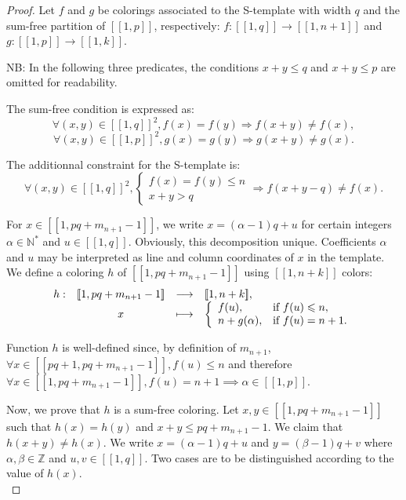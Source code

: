 \documentclass[final,onefignum,onetabnum]{siamart190516}
\begin{document}
\begin{proof}
	Let \(f\) and \(g\) be colorings associated to the S-template with width \(q\) and the sum-free partition of 
	\([\![1,p]\!]\), respectively: \(f : [\![1,q]\!] \longrightarrow [\![1,n+1]\!]\) and 
	\(g : [\![1,p]\!] \longrightarrow [\![1,k]\!]\).
	
	\par
	NB: In the following three predicates, the conditions \(x + y \leqslant q\)  and \(x + y \leqslant p\) are omitted for readability.
	\par
	The sum-free condition is expressed as:
	\[\forall (x,y) \in [\![1,q]\!]^2, f(x) = f(y) \Longrightarrow f(x+y) \neq f(x),\]
	\[\forall (x,y) \in [\![1,p]\!]^2, g(x) = g(y) \Longrightarrow g(x+y) \neq g(x).\]
	
	The additionnal constraint for the S-template is:
	\[
	\forall (x,y) \in [\![1,q]\!]^2, \left\{
	\begin{array}{l}
		f(x) = f(y) \leqslant n \\
		x + y > q
	\end{array}
	\right. \Longrightarrow f(x+y-q) \neq f(x).
	\]
	
	For \(x \in [\![1,pq+m_{n+1}-1]\!]\), we write \(x = (\alpha - 1) q + u\) for certain integers \(\alpha \in \mathbb{N}^*\) 
	and \(u \in [\![1,q]\!]\). Obviously, this decomposition unique. Coefficients \(\alpha\) and \(u\) may be interpreted as line 
	and column coordinates of \(x\) in the template. We define a coloring \(h\) of \([\![1,pq+m_{n+1}-1]\!]\) using \( [\![1,n+k]\!]\) colors:
	\[
	\begin{array}{c c c l}
		h : & [\![1,pq+m_{n+1}-1]\!] & \longrightarrow & [\![1,n+k]\!], \\
		& x & \longmapsto & 
		\left\{ \begin{array}{l l}
			f(u), & \text{if}~f(u) \leqslant n, \\
			n + g(\alpha), & \text{if}~f(u) = n + 1. \\
		\end{array} \right.
	\end{array}
	\]
	
	Function \(h\) is well-defined since, by definition of \(m_{n+1}\), \(\forall x \in [\![p q + 1, p q + m_{n + 1} - 1 ]\!], f(u) 
	\leqslant n\) and therefore \(\forall x \in [\![1,pq+m_{n+1}-1]\!], f(u) = n + 1 \implies \alpha \in [\![1, p]\!]\).
	
	\par
	Now, we prove that \(h\) is a sum-free coloring. Let \(x,y \in [\![1,pq + m_{n+1}-1]\!]\) such that \(h(x) = h(y)\) 
	and \(x+y \leqslant pq+m_{n+1}-1\). We claim that \(h(x+y) \neq h(x)\). We write \(x = (\alpha - 1) q + u\) and 
	\(y = (\beta - 1) q + v\) where \(\alpha, \beta \in \mathbb{Z}\) and \(u, v \in [\![1,q]\!]\). Two cases are to be
	distinguished according to the value of \(h(x)\). \\
	

\end{proof}
\end{document}
